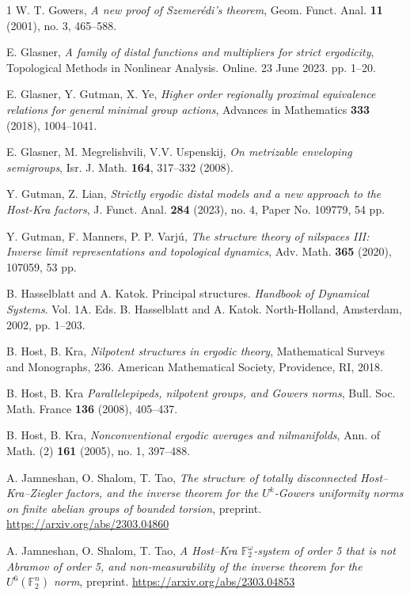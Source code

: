 \documentclass[a4paper,12pt,reqno]{amsart}
\theoremstyle{definition}
\newcommand{\mb}{\mathbb}
\begin{document}
\begin{thebibliography}{1}
 W. T. Gowers, \emph{A new proof of Szemer\'edi's theorem},  Geom. Funct. Anal. \textbf{11} (2001), no. 3, 465--588. 

 E. Glasner, \emph{A family of distal functions and multipliers for strict ergodicity},  Topological Methods in Nonlinear Analysis. Online. 23 June 2023. pp. 1--20. 

 E. Glasner, Y. Gutman, X. Ye, \emph{Higher order regionally proximal equivalence relations for general minimal group actions}, Advances in Mathematics \textbf{333} (2018), 1004--1041.

 E. Glasner, M. Megrelishvili, V.V. Uspenskij, \emph{On metrizable enveloping semigroups}, Isr. J. Math. \textbf{164}, 317--332 (2008).

 Y. Gutman, Z. Lian, \emph{Strictly ergodic distal models and a new approach to the Host-Kra factors}, J. Funct. Anal. \textbf{284} (2023), no. 4, Paper No. 109779, 54 pp.

 Y. Gutman, F. Manners, P. P. Varj\'u, \emph{The structure theory of nilspaces III: Inverse limit representations and topological dynamics}, Adv. Math. \textbf{365} (2020), 107059, 53 pp.

 B. Hasselblatt and A. Katok. Principal structures. \emph{Handbook of Dynamical Systems}. Vol. 1A. Eds. B. Hasselblatt and A. Katok. North-Holland, Amsterdam, 2002, pp. 1–203.

 B. Host, B. Kra, \emph{Nilpotent structures in ergodic theory}, Mathematical Surveys and Monographs, 236. American Mathematical Society, Providence, RI, 2018.

 B. Host, B. Kra \emph{Parallelepipeds, nilpotent groups, and Gowers norms}, Bull. Soc. Math. France \textbf{136} (2008), 405--437.

 B. Host, B. Kra, \emph{Nonconventional ergodic averages and nilmanifolds}, Ann. of Math. (2) \textbf{161} (2005), no. 1, 397--488.

 A. Jamneshan, O. Shalom, T. Tao, \emph{The structure of totally disconnected Host--Kra--Ziegler factors, and the inverse theorem for the $U^k$-Gowers uniformity norms on finite abelian groups of bounded torsion}, preprint. \url{https://arxiv.org/abs/2303.04860}

 A. Jamneshan, O. Shalom, T. Tao, \emph{A Host--Kra $\mb{F}_2^\omega$-system of order 5 that is not Abramov of order 5, and non-measurability of the inverse theorem for the $U^6(\mb{F}_2^n)$ norm}, preprint. \url{https://arxiv.org/abs/2303.04853}


\end{thebibliography}
\end{document}
